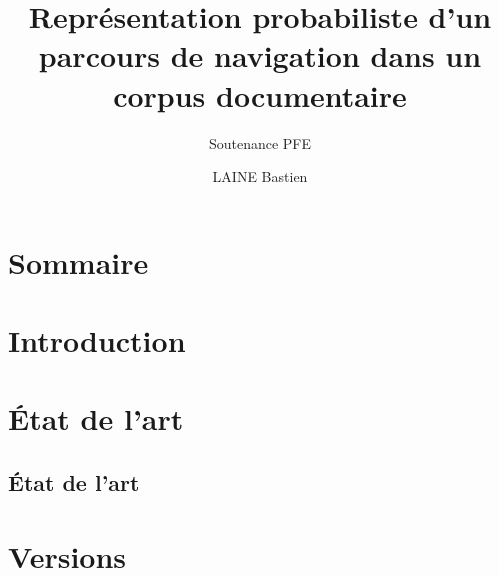 \documentclass{beamer}
\title{Représentation probabiliste d’un parcours de navigation dans un corpus documentaire}
\subtitle{Soutenance PFE}
\author{LAINE Bastien}
\institute{Génie Mathématique | INSA Rouen}
\begin{document}
    \begin{frame}
        \titlepage{}
    \end{frame}

    \section*{Sommaire}

    \begin{frame}
        \tableofcontents[hideallsubsections]
    \end{frame}

    \section{Introduction}
        \begin{frame}
        \end{frame}

    \section{État de l'art}
        \subsection{État de l'art}
            \begin{frame}
            \end{frame}

    \section{Versions}
\end{document}
